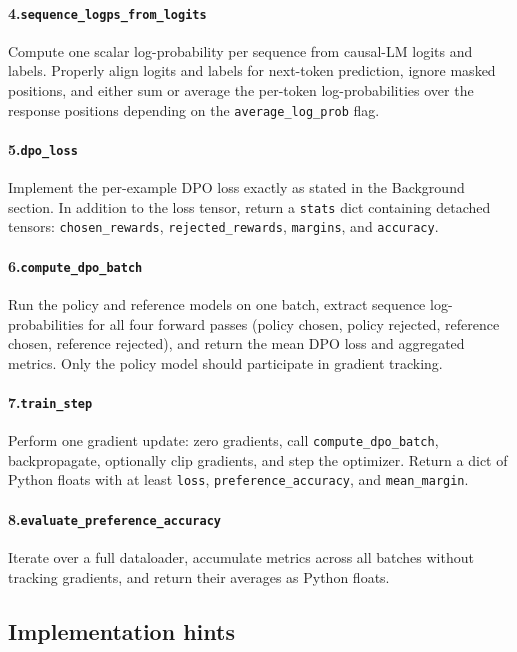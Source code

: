 \documentclass[11pt]{article}
\begin{document}
\paragraph{4.\enspace\texttt{sequence\_logps\_from\_logits}}
Compute one scalar log-probability per sequence from causal-LM logits and labels.
Properly align logits and labels for next-token prediction, ignore masked positions, and
either sum or average the per-token log-probabilities over the response positions depending on
the \texttt{average\_log\_prob} flag.

\paragraph{5.\enspace\texttt{dpo\_loss}}
Implement the per-example DPO loss exactly as stated in the Background section.
In addition to the loss tensor, return a \texttt{stats} dict containing detached tensors:
\texttt{chosen\_rewards}, \texttt{rejected\_rewards}, \texttt{margins}, and \texttt{accuracy}.

\paragraph{6.\enspace\texttt{compute\_dpo\_batch}}
Run the policy and reference models on one batch, extract sequence log-probabilities for
all four forward passes (policy chosen, policy rejected, reference chosen, reference rejected),
and return the mean DPO loss and aggregated metrics.
Only the policy model should participate in gradient tracking.

\paragraph{7.\enspace\texttt{train\_step}}
Perform one gradient update: zero gradients, call \texttt{compute\_dpo\_batch},
backpropagate, optionally clip gradients, and step the optimizer.
Return a dict of Python floats with at least \texttt{loss}, \texttt{preference\_accuracy},
and \texttt{mean\_margin}.

\paragraph{8.\enspace\texttt{evaluate\_preference\_accuracy}}
Iterate over a full dataloader, accumulate metrics across all batches without tracking
gradients, and return their averages as Python floats.

\subsection*{Implementation hints}
\end{document}
